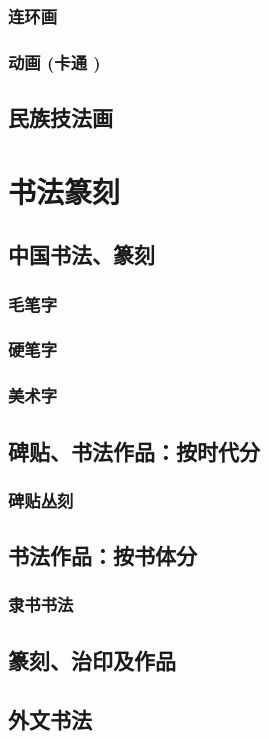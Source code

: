 \documentclass[UTF8]{../RepresentationUniverse}
\begin{document}
        \subsubsection{连环画}
        \subsubsection{动画 (卡通 )}
    \subsection{民族技法画}


\section{书法篆刻}
    \subsection{中国书法、篆刻}
        \subsubsection{毛笔字}
        \subsubsection{硬笔字}
        \subsubsection{美术字}
    \subsection{碑贴、书法作品：按时代分}
        \subsubsection{碑贴丛刻}
    \subsection{书法作品：按书体分}
        \subsubsection{隶书书法}
    \subsection{篆刻、治印及作品}
    \subsection{外文书法}
\end{document}
